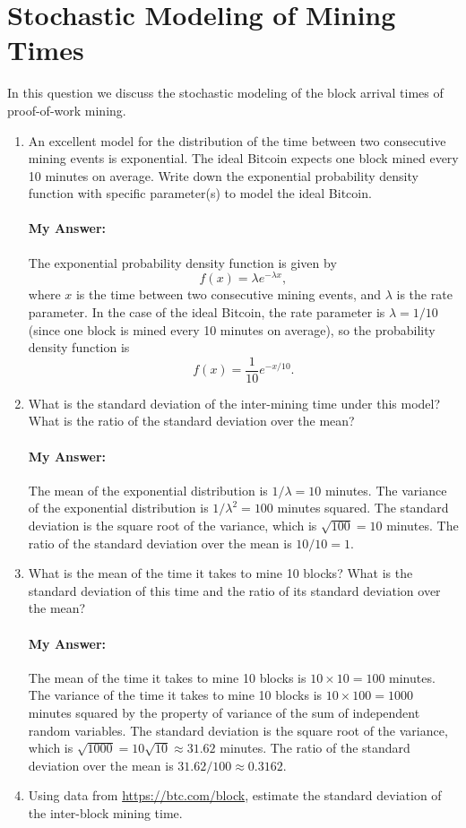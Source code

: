 \documentclass{article}
\begin{document}
\section{Stochastic Modeling of Mining Times}
In this question we discuss the stochastic modeling of the block arrival times of proof-of-work mining.
\begin{enumerate}[label=(\alph*)]
    \item An excellent model for the distribution of the time between two consecutive mining events is exponential. The ideal Bitcoin expects one block mined every 10 minutes on average. Write down the exponential probability density function with specific parameter(s) to model the ideal Bitcoin.
    \paragraph{My Answer:} The exponential probability density function is given by
    \[ f(x) = \lambda e^{-\lambda x}, \]
    where \( x \) is the time between two consecutive mining events, and \( \lambda \) is the rate parameter.  In the case of the ideal Bitcoin, the rate parameter is \( \lambda = 1/10 \) (since one block is mined every 10 minutes on average), so the probability density function is
    \[ f(x) = \frac{1}{10} e^{-x/10}. \]
    \item What is the standard deviation of the inter-mining time under this model? What is the ratio of the standard deviation over the mean?
    \paragraph{My Answer:} The mean of the exponential distribution is \( 1/\lambda = 10 \) minutes.  The variance of the exponential distribution is \( 1/\lambda^2 = 100 \) minutes squared.  The standard deviation is the square root of the variance, which is \( \sqrt{100} = 10 \) minutes.  The ratio of the standard deviation over the mean is \( 10/10 = 1 \).
    \item What is the mean of the time it takes to mine 10 blocks? What is the standard deviation of this time and the ratio of its standard deviation over the mean?
    \paragraph{My Answer:} The mean of the time it takes to mine 10 blocks is \( 10 \times 10 = 100 \) minutes.  The variance of the time it takes to mine 10 blocks is \( 10 \times 100 = 1000 \) minutes squared by the property of variance of the sum of independent random variables.  The standard deviation is the square root of the variance, which is \( \sqrt{1000} = 10\sqrt{10} \approx 31.62 \) minutes.  The ratio of the standard deviation over the mean is \( 31.62/100 \approx 0.3162 \).
    \item Using data from \url{https://btc.com/block}, estimate the standard deviation of the inter-block mining time.

\end{enumerate}
\end{document}
